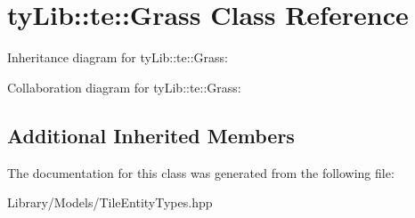 \hypertarget{classty_lib_1_1te_1_1_grass}{}\section{ty\+Lib\+:\+:te\+:\+:Grass Class Reference}
\label{classty_lib_1_1te_1_1_grass}


Inheritance diagram for ty\+Lib\+:\+:te\+:\+:Grass\+:


Collaboration diagram for ty\+Lib\+:\+:te\+:\+:Grass\+:
\subsection*{Additional Inherited Members}


The documentation for this class was generated from the following file\+:\begin{DoxyCompactItemize}
\item 
Library/\+Models/Tile\+Entity\+Types.\+hpp\end{DoxyCompactItemize}
